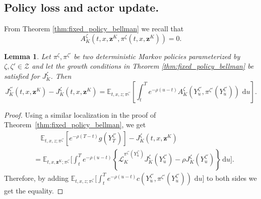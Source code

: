 \documentclass[11pt]{article}
\newtheorem{lemma}[theorem]{Lemma}
\theoremstyle{remarkitalic}
\theoremstyle{remarkitalic}
\newcommand{\E}{\mathbb E}
\newcommand{\dd}{\,\mathrm d}
\newcommand{\1}{\mathbf 1}
\begin{document}
\subsection{Policy loss and actor update.}

From Theorem \ref{thm:fixed_policy_bellman} we recall that
\[
    A_K^\zeta(t,x,\mathbf z^K,\pi^\zeta(t,x,\mathbf z^K))=0.
\]



\begin{lemma}
\label{lem:performance_difference}
Let $\pi^\zeta,\pi^{\zeta'}$ be two deterministic Markov policies parameterized by $\zeta,\zeta'\in \mathcal Z$ and let the growth conditions in Theorem \ref{thm:fixed_policy_bellman} be satisfied for $J^\zeta_K$. Then 
\[
    J_K^{\zeta'}(t,x,\mathbf z^K)-J_K^\zeta(t,x,\mathbf z^K)
    =
    \E_{t,x,z;\pi^{\zeta'}}\left[
        \int_t^T e^{-\rho(u-t)}
        A_K^\zeta(Y_u^{\zeta'},\pi^{\zeta'}(Y_u^{\zeta'}))\,\dd u
    \right].
\]
\end{lemma}

\begin{proof}
 Using a similar localization in the proof of Theorem~\ref{thm:fixed_policy_bellman}, we get
\[
\begin{aligned}
    &\quad\E_{t,x,z;\pi^{\zeta'}}
    \left[
        e^{-\rho(T-t)}g(Y_T^{\zeta'})
    \right]
    -
    J_K^\zeta(t,x,\mathbf z^K)\\
    &=
    \E_{t,x,\mathbf z^K;\pi^{\zeta'}}\Big[
    \int_t^T e^{-\rho(u-t)}
    \left\{
        \mathcal L_K^{\pi^{\zeta'}(Y_u^{\zeta'})}J_K^\zeta(Y_u^{\zeta'})
        -
        \rho J_K^\zeta(Y_u^{\zeta'})
    \right\}\dd u\Big].
\end{aligned}\]
Therefore, by adding $
\E_{t,x,z;\pi^{\zeta'}}\Big[
    \int_t^T e^{-\rho(u-t)}c(Y_u^{\zeta'},\pi^{\zeta'}(Y_u^{\zeta'}))\,\dd u\Big]$
to both sides we get the equality. 
\end{proof}
\end{document}
